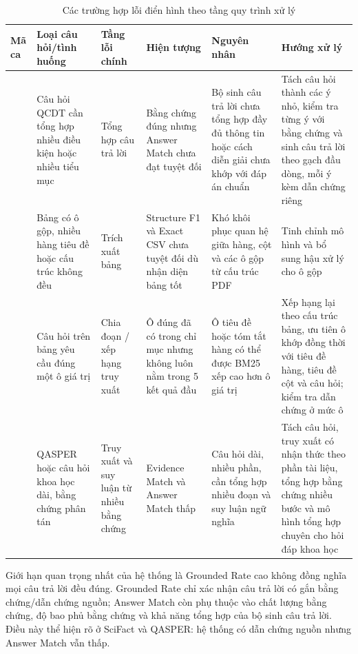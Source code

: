 \documentclass[../DoAn.tex]{subfiles}
\begin{document}
\begin{table}[H]
\centering
\caption{Các trường hợp lỗi điển hình theo tầng quy trình xử lý}
\label{tab:error-cases-by-layer}

\scriptsize
\begin{tabularx}{\textwidth}{|
>{\raggedright\arraybackslash}p{}|
>{\raggedright\arraybackslash}p{}|
>{\raggedright\arraybackslash}p{}|
>{\raggedright\arraybackslash}p{}|
>{\raggedright\arraybackslash}p{}|
>{\raggedright\arraybackslash}X|
}
\hline
\textbf{Mã ca} & \textbf{Loại câu hỏi/tình huống} & \textbf{Tầng lỗi chính} & \textbf{Hiện tượng} & \textbf{Nguyên nhân} & \textbf{Hướng xử lý} \\
\hline
1 & Câu hỏi QCDT cần tổng hợp nhiều điều kiện hoặc nhiều tiểu mục & Tổng hợp câu trả lời & Bằng chứng đúng nhưng Answer Match chưa đạt tuyệt đối & Bộ sinh câu trả lời chưa tổng hợp đầy đủ thông tin hoặc cách diễn giải chưa khớp với đáp án chuẩn & Tách câu hỏi thành các ý nhỏ, kiểm tra từng ý với bằng chứng và sinh câu trả lời theo gạch đầu dòng, mỗi ý kèm dẫn chứng riêng \\
\hline
2 & Bảng có ô gộp, nhiều hàng tiêu đề hoặc cấu trúc không đều & Trích xuất bảng & Structure F1 và Exact CSV chưa tuyệt đối dù nhận diện bảng tốt & Khó khôi phục quan hệ giữa hàng, cột và các ô gộp từ cấu trúc PDF & Tinh chỉnh mô hình và bổ sung hậu xử lý cho ô gộp \\
\hline
3 & Câu hỏi trên bảng yêu cầu đúng một ô giá trị
& Chia đoạn / xếp hạng truy xuất
& Ô đúng đã có trong chỉ mục nhưng không luôn nằm trong 5 kết quả đầu
& Ô tiêu đề hoặc tóm tắt hàng có thể được BM25 xếp cao hơn ô giá trị
& Xếp hạng lại theo cấu trúc bảng, ưu tiên ô khớp đồng thời với tiêu đề hàng, tiêu đề cột và câu hỏi; kiểm tra dẫn chứng ở mức ô \\
\hline
4 & QASPER hoặc câu hỏi khoa học dài, bằng chứng phân tán & Truy xuất và suy luận từ nhiều bằng chứng & Evidence Match và Answer Match thấp & Câu hỏi dài, nhiều phần, cần tổng hợp nhiều đoạn và suy luận ngữ nghĩa & Tách câu hỏi, truy xuất có nhận thức theo phần tài liệu, tổng hợp bằng chứng nhiều bước và mô hình tổng hợp chuyên cho hỏi đáp khoa học \\
\hline

\end{tabularx}
\end{table}



Giới hạn quan trọng nhất của hệ thống là Grounded Rate cao không đồng nghĩa mọi câu trả lời đều đúng. Grounded Rate chỉ xác nhận câu trả lời có gắn bằng chứng/dẫn chứng nguồn; Answer Match còn phụ thuộc vào chất lượng bằng chứng, độ bao phủ bằng chứng và khả năng tổng hợp của bộ sinh câu trả lời. Điều này thể hiện rõ ở SciFact và QASPER: hệ thống có dẫn chứng nguồn nhưng Answer Match vẫn thấp.
\end{document}
